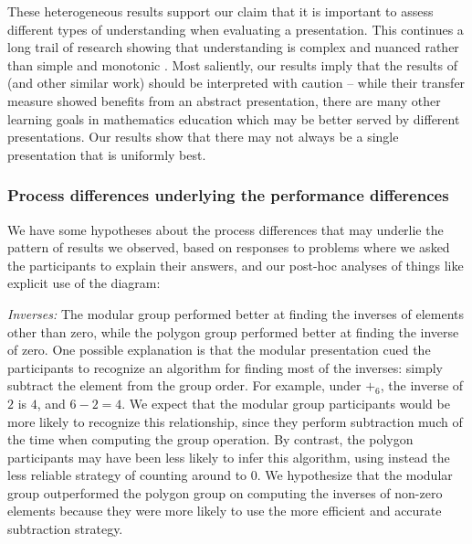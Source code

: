 \documentclass[man,10pt]{apa6}
\begin{document}
These heterogeneous results support our claim that it is important to assess different types of understanding when evaluating a presentation. This continues a long trail of research showing that understanding is complex and nuanced rather than simple and monotonic \cite{Greeno1987,Bisanz1992,Nokes2005}. Most saliently, our results imply that the results of  (and other similar work) should be interpreted with caution -- while their transfer measure showed benefits from an abstract presentation, there are many other learning goals in mathematics education which may be better served by different presentations. Our results show that there may not always be a single presentation that is uniformly best. 
\subsubsection{Process differences underlying the performance differences}
We have some hypotheses about the process differences that may underlie the pattern of results we observed, based on responses to problems where we asked the participants to explain their answers, and our post-hoc analyses of things like explicit use of the diagram:\par 
\textit{Inverses:} The modular group performed better at finding the inverses of elements other than zero, while the polygon group performed better at finding the inverse of zero. One possible explanation is that the modular presentation cued the participants to recognize an algorithm for finding most of the inverses: simply subtract the element from the group order. For example, under $+_6$, the inverse of $2$ is $4$, and $6-2 = 4$. We expect that the modular group participants would be more likely to recognize this relationship, since they perform subtraction much of the time when computing the group operation. By contrast, the polygon participants may have been less likely to infer this algorithm, using instead the less reliable strategy of counting around to 0. We hypothesize that the modular group outperformed the polygon group on computing the inverses of non-zero elements because they were more likely to use the more efficient and accurate subtraction strategy. \par 
\end{document}
